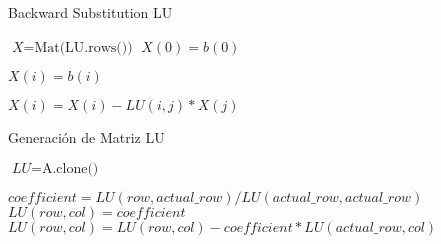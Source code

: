 \documentclass[a4paper]{article}
\begin{document}
\begin{algorithm}
\caption{Backward Substitution LU}\label{euclid}
\begin{algorithmic}[1]


    \State $\textit{X} = \text{Mat(LU.rows())}$
    \State $X(0) = b(0)$

      \State $X(i) = b(i)$

        \State $X(i) = X(i) - LU(i,j)*X(j)$
      \EndFor

    \EndFor
      
  \EndFunction

\end{algorithmic}
\end{algorithm}




\begin{algorithm}
\caption{Generación de Matriz LU}\label{euclid}
\begin{algorithmic}[1]


    \State $\textit{LU} = \text{A.clone()}$

        \Return
      \EndIf

          \State $coefficient = LU(row, actual\_row) / LU(actual\_row, actual\_row)$
              \State $LU(row,col) = coefficient$
            \Else
              \State $LU(row, col) = LU(row, col) - coefficient * LU(actual\_row, col)$
            \EndIf
          \EndFor

      \EndFor    
    \EndFor

  \EndFunction

\end{algorithmic}
\end{algorithm}
\end{document}

